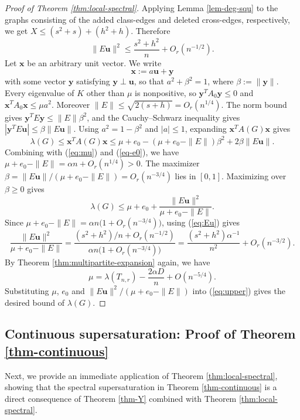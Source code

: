 \documentclass[11pt,a4paper]{article}
\theoremstyle{definition}
\theoremstyle{plain}
\renewcommand{\le}{\leqslant}
\renewcommand{\ge}{\geqslant}
\begin{document}
\begin{proof}[Proof of Theorem \ref{thm:local-spectral}]
 Applying Lemma \ref{lem-deg-squ} 
to the graphs consisting of the added class-edges and deleted cross-edges, respectively, we get  $X\le(s^2+s)+(h^2+h)$. Therefore
\begin{equation} \label{eq:Eu}
        \|E\bm{u}\|^2\le\frac{s^2+h^2}{n}+O_r(n^{-1/2}).
\end{equation}
Let $\bm{x}$ be an arbitrary unit vector. We write 
$$\bm{x} :=a\bm{u}+\bm{y}$$
 with some vector $\bm{y}$ satisfying $\bm{y}\perp \bm{u}$, so that $a^2+\beta^2=1$,
where $\beta:=\|\bm{y}\|$. Every eigenvalue of $K$ other than
$\mu$ is nonpositive, so $\bm{y}^{T}A_0\bm{y}\le0$ and $\bm{x}^{T}A_0\bm{x}\le\mu a^2$. Moreover
$\|E\|\le \sqrt{2(s+h)}=O_r(n^{1/4})$. The norm bound gives  $\bm{y}^{T}E\bm{y}\le\|E\|\beta^2$, 
and the Cauchy--Schwarz inequality gives $|\bm{y}^{T}E\bm{u}|\le\beta\|E\bm{u}\|$. 
Using $a^2=1-\beta^2$ and $|a|\le1$, expanding $\bm{x}^TA(G)\bm{x}$ gives 
\[
   \lambda (G)\le \bm{x}^{T}A(G)\bm{x}\le \mu+e_0-(\mu+e_0-\|E\|)\beta^2+2\beta\|E\bm{u}\|.
\]
Combining with (\ref{eq:mu}) and (\ref{eq-e0}), 
we have $\mu+e_0-\|E\|=\alpha n+O_r(n^{1/4})>0$. 
The maximizer 
$\beta=\|E\bm{u}\|/(\mu+e_0-\|E\|)=O_r(n^{-3/4})$ lies in $[0,1]$. Maximizing over
$\beta\ge0$ gives
\begin{equation} \label{eq:upper}
        \lambda(G)\le \mu+e_0+\frac{\|E\bm{u}\|^2}{\mu+e_0-\|E\|}.
\end{equation}
 Since
$\mu+e_0-\|E\|=\alpha n\bigl(1+O_r(n^{-3/4})\bigr)$, using (\ref{eq:Eu}) gives  
\[
        \frac{\|E\bm{u}\|^2}{\mu+e_0-\|E\|}
        =\frac{(s^2+h^2)/n+O_r(n^{-1/2})}{\alpha n\bigl(1+O_r(n^{-3/4})\bigr)}
        =\frac{(s^2+h^2)\alpha^{-1}}{ n^2}+O_r(n^{-3/2}).
\]
By Theorem \ref{thm:multipartite-expansion} again, we have 
\[ \mu= \lambda (T_{n,r}) - \frac{2\alpha D}{n} + O(n^{-5/4}).  \]
Substituting $\mu$, $e_0$ and $\|E\bm{u}\|^2/(\mu+e_0-\|E\|)$ into
(\ref{eq:upper}) gives the desired  bound of $\lambda (G)$.
\end{proof}


\subsection{Continuous supersaturation: Proof of Theorem \ref{thm-continuous}} 

Next, we provide an immediate application of Theorem \ref{thm:local-spectral}, showing that the spectral supersaturation in Theorem \ref{thm-continuous} is a direct consequence of Theorem \ref{thm-Y} combined with Theorem \ref{thm:local-spectral}.  
\end{document}
